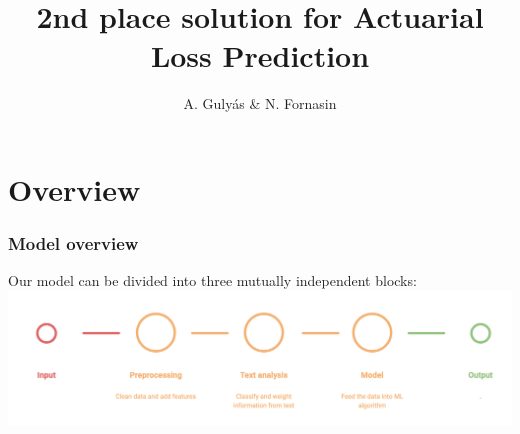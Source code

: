 \documentclass{beamer}
\title{2nd place solution for Actuarial Loss Prediction} %
\author{A. Guly\'{a}s \& N. Fornasin} %
\institute[ALU] %
{
Team Boosted Goose\\ %
\medskip
}
\date{\quad} %
\begin{document}
\begin{frame}
\titlepage %
\end{frame}







\section{Overview}
\begin{frame}
\frametitle{Model overview}
Our model can be divided into three mutually independent blocks:
\includegraphics[width=\textwidth]{./images/modeldiagram.png}
\end{frame}
\end{document}
